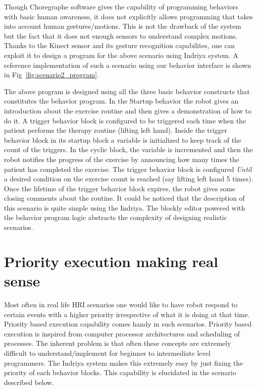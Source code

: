 Though Choregraphe software gives the capability of programming behaviors with basic human awareness, it does not explicitly allows programming that takes into account human gestures/motions. This is not the drawback of the system but the fact that it does not enough sensors to understand complex motions. Thanks to the Kinect sensor and its gesture recognition capabilites, one can exploit it to design a program for the above scenario using Indriya system. A reference implementation of such a scenario using our behavior interface is shown in Fig~\ref{fig:scenario2_program}.

The above program is designed using all the three basic behavior constructs that constitutes the behavior program. In the Startup behavior the robot gives an introduction about the exercise routine and then gives a demonstration of how to do it. A trigger behavior block is configured to be triggered each time when the patient performs the therapy routine (lifting left hand). Inside the trigger behavior block in its startup block a variable is initialized to keep track of the count of the triggers. In the cyclic block, the variable is incremented and then the robot notifies the progress of the exercise by announcing how many times the patient has completed the exercise. The trigger behavior block is configured \emph{Until} a desired condition on the exercise count is reached (say lifting left hand 5 times). Once the lifetime of the trigger behavior block expires, the robot gives some closing comments about the routine. It could be noticed that the description of this scenario is quite simple using the Indriya. The blockly editor powered with the behavior program logic abstracts the complexity of designing realistic scenarios.

\section{Priority execution making real sense}
Most often in real life HRI scenarios one would like to have robot respond to certain events with a higher priority irrespective of what it is doing at that time. Priority based execution capability comes handy in such scenarios. Priority based execution is inspired from computer processor architectures and scheduling of processes. The inherent problem is that often these concepts are extremely difficult to understand/implement for beginner to intermediate level programmers. The Indriya system makes this extremely easy by just fixing the priority of each behavior blocks. This capability is elucidated in the scenario described below. 

